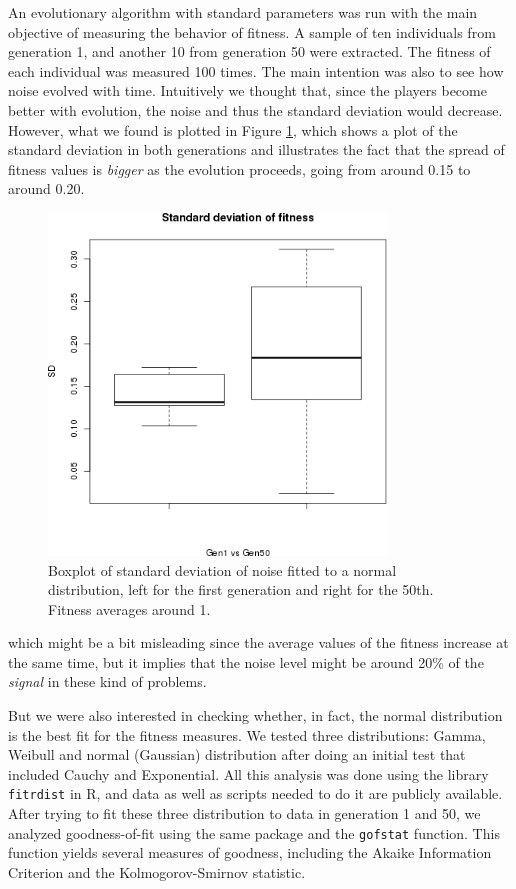 \documentclass{llncs}
\begin{document}
An evolutionary algorithm with standard parameters was run with the
main objective of measuring the behavior of fitness. A sample of ten
individuals from generation 1, and another 10 from generation 50 were
extracted. The fitness of each individual was measured 100 times. 
The main intention was also to see how noise evolved with
time. Intuitively we thought that, since the players become better
with evolution, the noise and thus the standard deviation would
decrease. However, what we found is plotted in Figure \ref{fig:sd},
which shows a plot of the standard deviation in both generations and
illustrates the fact that the spread of fitness values is {\em bigger}
as the evolution proceeds, going from around 0.15 to around 0.20. 
%
\begin{figure}[ht!b]
\centering
\includegraphics[width=0.8\textwidth]{../images/sd.png}
\caption{Boxplot of standard deviation of noise fitted to a normal
  distribution, left for the first generation and right for the
  50th. Fitness averages around 1. \label{fig:sd}}
\end{figure}
%
which might be a bit misleading since the average values of
the fitness increase at the same time, but it implies that the noise
level might be around 20\% of the {\em signal} in these kind of problems. 

But we were also interested in checking whether, in fact, the normal
distribution is the best fit for the fitness measures. We tested three
distributions: Gamma, Weibull and normal (Gaussian) distribution after
doing an initial test that included Cauchy and Exponential. All this
analysis was done using the library {\tt fitrdist} in R, and data as
well as scripts needed to do it are publicly available. After trying
to fit these three distribution to data in generation 1 and 50, we
analyzed goodness-of-fit using the same package and the {\tt gofstat}
function. This function yields several measures of goodness, including
the Akaike Information Criterion and the Kolmogorov-Smirnov statistic.
\end{document}

